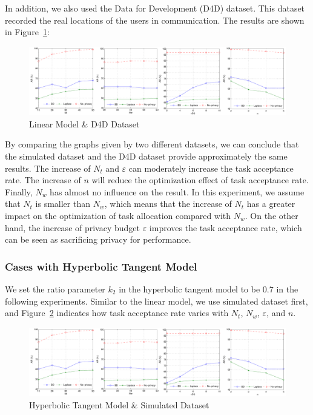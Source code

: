 In addition, we also used the Data for Development (D4D) dataset. This dataset recorded the real locations of the users in communication. The results are shown in Figure~\ref{img:LinD4D}:

\begin{figure}
\includegraphics[width=1\textwidth]{LinD4D}
\caption{Linear Model \& D4D Dataset}
\label{img:LinD4D}
\end{figure}

By comparing the graphs given by two different datasets, we can conclude that the simulated dataset and the D4D dataset provide approximately the same results. The increase of $N_t$ and $\varepsilon$ can moderately increase the task acceptance rate. The increase of $n$ will reduce the optimization effect of task acceptance rate. Finally, $N_w$ has almost no influence on the result. In this experiment, we assume that $N_t$ is smaller than $N_w$, which means that the increase of $N_t$ has a greater impact on the optimization of task allocation compared with $N_w$. On the other hand, the increase of privacy budget $\varepsilon$ improves the task acceptance rate, which can be seen as sacrificing privacy for performance.

\subsubsection{Cases with Hyperbolic Tangent Model}
We set the ratio parameter $k_2$ in the hyperbolic tangent model to be $0.7$ in the following experiments. Similar to the linear model, we use simulated dataset first, and Figure~\ref{img:TanhSim} indicates how task acceptance rate varies with $N_t$, $N_w$, $\varepsilon$, and $n$.

\begin{figure}
\includegraphics[width=1\textwidth]{TanhSim}
\caption{Hyperbolic Tangent Model \& Simulated Dataset}
\label{img:TanhSim}
\end{figure}

